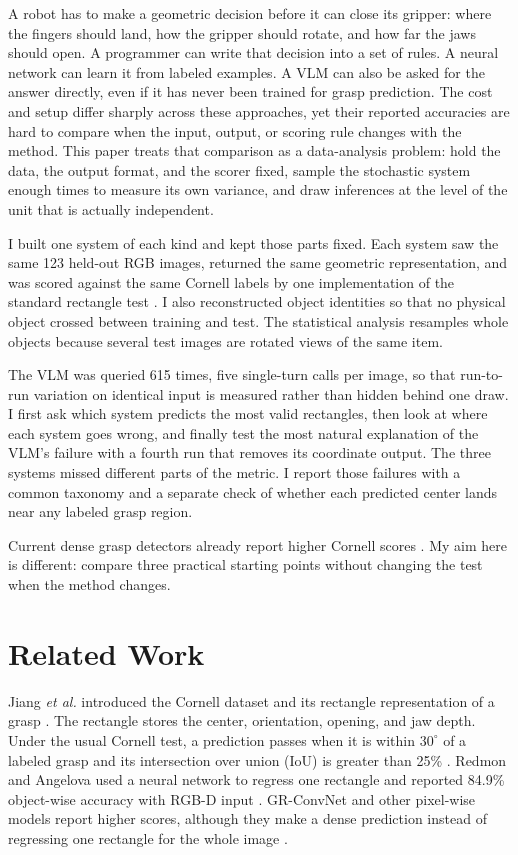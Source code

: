 \documentclass[10pt,conference,compsoc]{IEEEtran}
\begin{document}
A robot has to make a geometric decision before it can close its gripper:
where the fingers should land, how the gripper should rotate, and how far the
jaws should open. A programmer can write that decision into a set of rules. A
neural network can learn it from labeled examples. A VLM can also be asked for
the answer directly, even if it has never been trained for grasp prediction.
The cost and setup differ sharply across these approaches, yet their reported
accuracies are hard to compare when the input, output, or scoring rule changes
with the method. This paper treats that comparison as a data-analysis
problem: hold the data, the output format, and the scorer fixed, sample the
stochastic system enough times to measure its own variance, and draw
inferences at the level of the unit that is actually independent.

I built one system of each kind and kept those parts fixed. Each system saw
the same 123 held-out RGB images, returned the same geometric representation,
and was scored against the same Cornell labels by one implementation of the
standard rectangle test \cite{jiang2011,lenz2015}. I also reconstructed
object identities so that no physical object crossed between training and
test. The statistical analysis resamples whole objects because several test
images are rotated views of the same item.

The VLM was queried 615 times, five single-turn calls per image, so that
run-to-run variation on identical input is measured rather than hidden
behind one draw. I first ask which system predicts the most valid
rectangles, then look at where each system goes wrong, and finally test the most natural explanation
of the VLM's failure with a fourth run that removes its coordinate output. The three systems missed different parts of the
metric. I report those failures with a common taxonomy and a separate check
of whether each predicted center lands near any labeled grasp region.

Current dense grasp detectors already report higher Cornell scores
\cite{kumra2020}. My aim here is different: compare three practical starting
points without changing the test when the method changes.

\section{Related Work}

Jiang \emph{et al.} introduced the Cornell dataset and its rectangle
representation of a grasp \cite{jiang2011}. The rectangle stores the center,
orientation, opening, and jaw depth. Under the usual Cornell test, a
prediction passes when it is within $30^\circ$ of a labeled grasp and its
intersection over union (IoU) is greater than 25\% \cite{lenz2015}. Redmon
and Angelova used a neural network to regress one rectangle and reported
84.9\% object-wise accuracy with RGB-D input \cite{redmon2015}. GR-ConvNet
and other pixel-wise models report higher scores, although they make a dense
prediction instead of regressing one rectangle for the whole image
\cite{kumra2020}.
\end{document}
